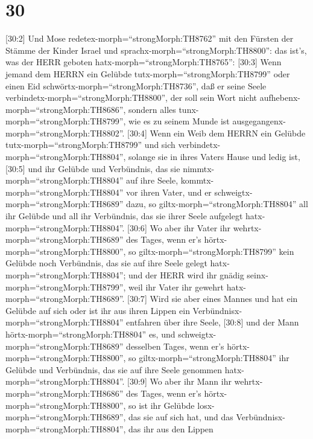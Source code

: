 \hypertarget{section-29}{%
\section{30}\label{section-29}}

 {[}30:2{]} Und Mose redetex-morph=``strongMorph:TH8762''
mit den Fürsten der Stämme der Kinder Israel und
sprachx-morph=``strongMorph:TH8800'': das ist's, was der HERR geboten
hatx-morph=``strongMorph:TH8765'':  {[}30:3{]} Wenn jemand
dem HERRN ein Gelübde tutx-morph=``strongMorph:TH8799'' oder einen Eid
schwörtx-morph=``strongMorph:TH8736'', daß er seine Seele
verbindetx-morph=``strongMorph:TH8800'', der soll sein Wort nicht
aufhebenx-morph=``strongMorph:TH8686'', sondern alles
tunx-morph=``strongMorph:TH8799'', wie es zu seinem Munde ist
ausgegangenx-morph=``strongMorph:TH8802''.  {[}30:4{]} Wenn
ein Weib dem HERRN ein Gelübde tutx-morph=``strongMorph:TH8799'' und
sich verbindetx-morph=``strongMorph:TH8804'', solange sie in ihres
Vaters Hause und ledig ist,  {[}30:5{]} und ihr Gelübde und
Verbündnis, das sie nimmtx-morph=``strongMorph:TH8804'' auf ihre Seele,
kommtx-morph=``strongMorph:TH8804'' vor ihren Vater, und er
schweigtx-morph=``strongMorph:TH8689'' dazu, so
giltx-morph=``strongMorph:TH8804'' all ihr Gelübde und all ihr
Verbündnis, das sie ihrer Seele aufgelegt
hatx-morph=``strongMorph:TH8804''.  {[}30:6{]} Wo aber ihr
Vater ihr wehrtx-morph=``strongMorph:TH8689'' des Tages, wenn er's
hörtx-morph=``strongMorph:TH8800'', so
giltx-morph=``strongMorph:TH8799'' kein Gelübde noch Verbündnis, das sie
auf ihre Seele gelegt hatx-morph=``strongMorph:TH8804''; und der HERR
wird ihr gnädig seinx-morph=``strongMorph:TH8799'', weil ihr Vater ihr
gewehrt hatx-morph=``strongMorph:TH8689''.  {[}30:7{]} Wird
sie aber eines Mannes und hat ein Gelübde auf sich oder ist ihr aus
ihren Lippen ein Verbündnisx-morph=``strongMorph:TH8804'' entfahren über
ihre Seele,  {[}30:8{]} und der Mann
hörtx-morph=``strongMorph:TH8804'' es, und
schweigtx-morph=``strongMorph:TH8689'' desselben Tages, wenn er's
hörtx-morph=``strongMorph:TH8800'', so
giltx-morph=``strongMorph:TH8804'' ihr Gelübde und Verbündnis, das sie
auf ihre Seele genommen hatx-morph=``strongMorph:TH8804''. 
{[}30:9{]} Wo aber ihr Mann ihr wehrtx-morph=``strongMorph:TH8686'' des
Tages, wenn er's hörtx-morph=``strongMorph:TH8800'', so ist ihr Gelübde
losx-morph=``strongMorph:TH8689'', das sie auf sich hat, und das
Verbündnisx-morph=``strongMorph:TH8804'', das ihr aus den Lippen
